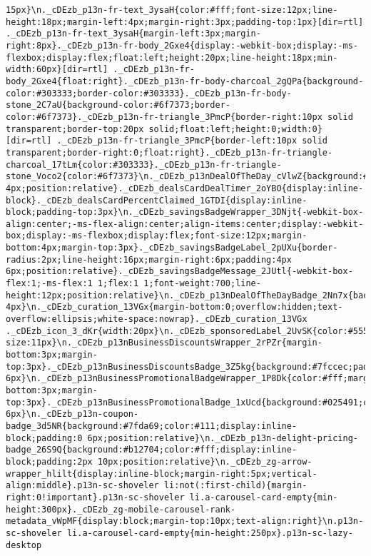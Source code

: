 \documentclass[
]{article}
\begin{document}
\begin{verbatim}
15px}\n._cDEzb_p13n-fr-text_3ysaH{color:#fff;font-size:12px;line-height:18px;margin-left:4px;margin-right:3px;padding-top:1px}[dir=rtl] ._cDEzb_p13n-fr-text_3ysaH{margin-left:3px;margin-right:8px}._cDEzb_p13n-fr-body_2Gxe4{display:-webkit-box;display:-ms-flexbox;display:flex;float:left;height:20px;line-height:18px;min-width:60px}[dir=rtl] ._cDEzb_p13n-fr-body_2Gxe4{float:right}._cDEzb_p13n-fr-body-charcoal_2gQPa{background-color:#303333;border-color:#303333}._cDEzb_p13n-fr-body-stone_2C7aU{background-color:#6f7373;border-color:#6f7373}._cDEzb_p13n-fr-triangle_3PmcP{border-right:10px solid transparent;border-top:20px solid;float:left;height:0;width:0}[dir=rtl] ._cDEzb_p13n-fr-triangle_3PmcP{border-left:10px solid transparent;border-right:0;float:right}._cDEzb_p13n-fr-triangle-charcoal_17tLm{color:#303333}._cDEzb_p13n-fr-triangle-stone_Voco2{color:#6f7373}\n._cDEzb_p13nDealOfTheDay_cVlwZ{background:#b12704;color:#fff;float:right;padding:2px 4px;position:relative}._cDEzb_dealsCardDealTimer_2oYBO{display:inline-block}._cDEzb_dealsCardPercentClaimed_1GTDI{display:inline-block;padding-top:3px}\n._cDEzb_savingsBadgeWrapper_3DNjt{-webkit-box-align:center;-ms-flex-align:center;align-items:center;display:-webkit-box;display:-ms-flexbox;display:flex;font-size:12px;margin-bottom:4px;margin-top:3px}._cDEzb_savingsBadgeLabel_2pUXu{border-radius:2px;line-height:16px;margin-right:6px;padding:4px 6px;position:relative}._cDEzb_savingsBadgeMessage_2JUtl{-webkit-box-flex:1;-ms-flex:1 1;flex:1 1;font-weight:700;line-height:12px;position:relative}\n._cDEzb_p13nDealOfTheDayBadge_2Nn7x{background:#b12704;color:#fff;padding:2px 4px}\n._cDEzb_curation_13VGx{margin-bottom:0;overflow:hidden;text-overflow:ellipsis;white-space:nowrap}._cDEzb_curation_13VGx ._cDEzb_icon_3_dKr{width:20px}\n._cDEzb_sponsoredLabel_2UvSK{color:#555;font-size:11px}\n._cDEzb_p13nBusinessDiscountsWrapper_2rPZr{margin-bottom:3px;margin-top:3px}._cDEzb_p13nBusinessDiscountsBadge_3Z5kg{background:#7fccec;padding:3px 6px}\n._cDEzb_p13nBusinessPromotionalBadgeWrapper_1P8Dk{color:#fff;margin-bottom:3px;margin-top:3px}._cDEzb_p13nBusinessPromotionalBadge_1xUcd{background:#025491;color:#fff;padding:4px 6px}\n._cDEzb_p13n-coupon-badge_3d5NR{background:#7fda69;color:#111;display:inline-block;padding:0 6px;position:relative}\n._cDEzb_p13n-delight-pricing-badge_26S9Q{background:#b12704;color:#fff;display:inline-block;padding:2px 10px;position:relative}\n._cDEzb_zg-arrow-wrapper_hlilt{display:inline-block;margin-right:5px;vertical-align:middle}.p13n-sc-shoveler li:not(:first-child){margin-right:0!important}.p13n-sc-shoveler li.a-carousel-card-empty{min-height:300px}._cDEzb_zg-mobile-carousel-rank-metadata_vWpMF{display:block;margin-top:10px;text-align:right}\n.p13n-sc-shoveler li.a-carousel-card-empty{min-height:250px}.p13n-sc-lazy-desktop 
\end{verbatim}
\end{document}
